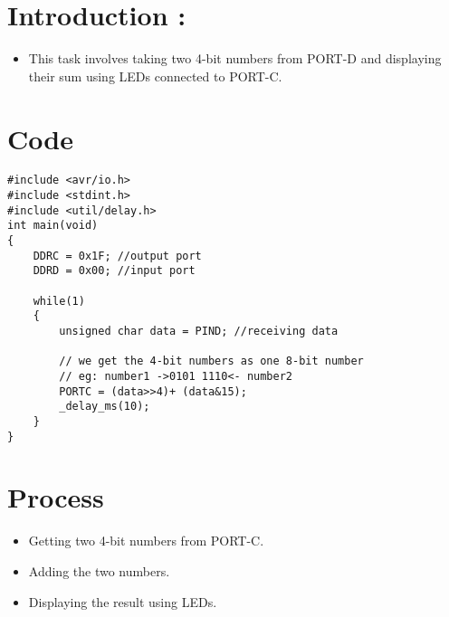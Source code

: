 
\begin{center}
    \fbox{\Large{\textbf{\textcolor{red}{Bonus Question}}}}
\end{center}
\section*{Introduction :}
\begin{itemize}
    \item This task involves taking two 4-bit numbers from PORT-D and displaying their
			sum using LEDs connected to PORT-C.
\end{itemize}

\section*{Code}

\begin{lstlisting}[style=CStyle]
#include <avr/io.h>
#include <stdint.h>
#include <util/delay.h>
int main(void)
{
	DDRC = 0x1F; //output port
	DDRD = 0x00; //input port
	
	while(1)
	{
		unsigned char data = PIND; //receiving data 

		// we get the 4-bit numbers as one 8-bit number
		// eg: number1 ->0101 1110<- number2
		PORTC = (data>>4)+ (data&15); 
		_delay_ms(10);
	}
}

\end{lstlisting}
\section*{Process}
\begin{itemize}
    \item Getting two 4-bit numbers from PORT-C.
    \item Adding the two numbers.
    \item Displaying the result using LEDs.
\end{itemize}
